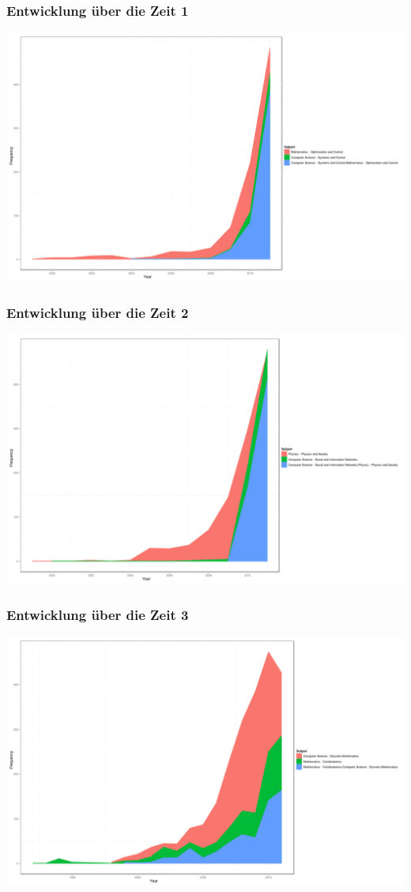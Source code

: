 \documentclass[12pt, xcolor=table]{beamer}
\begin{document}
\begin{frame}
	\frametitle{Entwicklung über die Zeit 1}
	\begin{center}
		\includegraphics[scale=0.25]{../../visual/trend/csmath.png}
	\end{center}
\end{frame}
\begin{frame}
	\frametitle{Entwicklung über die Zeit 2}
	\begin{center}
		\includegraphics[scale=0.25]{../../visual/trend/csph.png}
	\end{center}
\end{frame}
\begin{frame}
	\frametitle{Entwicklung über die Zeit 3}
	\begin{center}
		\includegraphics[scale=0.25]{../../visual/trend/combcs.png}
	\end{center}
\end{frame}
\end{document}
